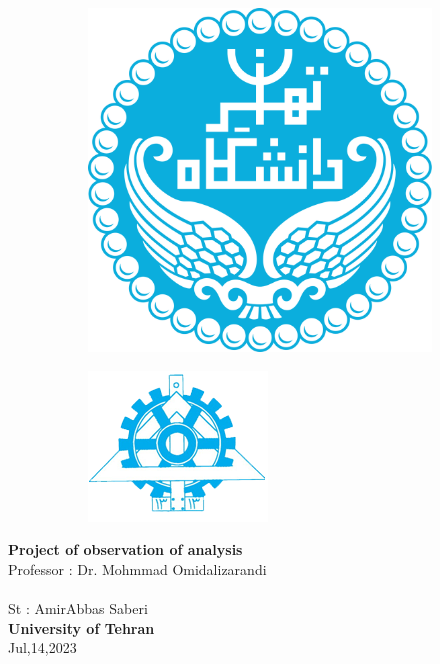 \documentclass[12pt]{article}
\begin{document}
\begin{figure}[!tbp]
  \begin{subfigure}[b]{0.2 \textwidth}
    \includegraphics[width=\textwidth]{img/uni}
  \end{subfigure}
  \hfill
  \begin{subfigure}[b]{0.25\textwidth}
    \includegraphics[width=\textwidth]{img/fani}
  \end{subfigure}
\end{figure}
\begin{center}
\textbf{Project of observation of analysis} \\[1in]
Professor : Dr. Mohmmad Omidalizarandi\\~\\
St : AmirAbbas Saberi
\\[4in]
\textbf{University of Tehran}\\
Jul,14,2023
\end{center}
	\thispagestyle{firstpage}
\newpage
\end{document}
